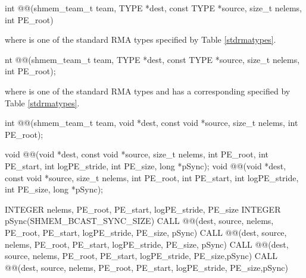 
\begin{apidefinition}

{\color{Green}
\begin{C11synopsis}
int @@(shmem_team_t team, TYPE *dest, const TYPE *source, size_t nelems, int PE_root)
\end{C11synopsis}
where \TYPE{} is one of the standard \ac{RMA} types specified by Table \ref{stdrmatypes}.
}

\begin{Csynopsis}
\end{Csynopsis}
{\color{Green}
\begin{CsynopsisCol}
nt @@(shmem_team_t team, TYPE *dest, const TYPE *source, size_t nelems, int PE_root);
\end{CsynopsisCol}
where \TYPE{} is one of the standard \ac{RMA} types and has a corresponding \TYPENAME{} specified by Table \ref{stdrmatypes}.

\begin{CsynopsisCol}
int @@(shmem_team_t team, void *dest, const void *source, size_t nelems, int PE_root);
\end{CsynopsisCol}
}
\begin{DeprecateBlock}
\begin{CsynopsisCol}
void @@(void *dest, const void *source, size_t nelems, int PE_root, int PE_start, int logPE_stride, int PE_size, long *pSync);
void @@(void *dest, const void *source, size_t nelems, int PE_root, int PE_start, int logPE_stride, int PE_size, long *pSync);
\end{CsynopsisCol}
\end{DeprecateBlock}

\begin{Fsynopsis}
INTEGER nelems, PE_root, PE_start, logPE_stride, PE_size
INTEGER pSync(SHMEM_BCAST_SYNC_SIZE)
CALL @@(dest, source, nelems, PE_root, PE_start, logPE_stride, PE_size, pSync)
CALL @@(dest, source, nelems, PE_root, PE_start, logPE_stride, PE_size, pSync)
CALL @@(dest, source, nelems, PE_root, PE_start, logPE_stride, PE_size,pSync)
CALL @@(dest, source, nelems, PE_root, PE_start, logPE_stride, PE_size,pSync)
\end{Fsynopsis}
 

\end{apidefinition}
